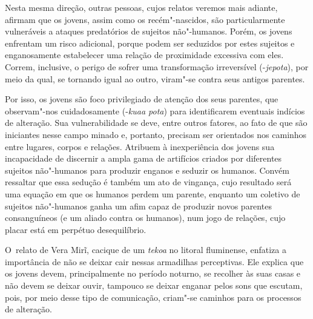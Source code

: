 Nesta mesma direção, outras pessoas, cujos relatos veremos mais adiante,
afirmam que os jovens, assim como os recém"-nascidos, são
particularmente vulneráveis a ataques predatórios de sujeitos
não"-humanos. Porém, os jovens enfrentam um risco adicional, porque
podem ser seduzidos por estes sujeitos e enganosamente estabelecer uma
relação de proximidade excessiva com eles. Correm, inclusive, o perigo
de sofrer uma transformação irreversível (-\emph{jepota}), por meio da qual,
se tornando igual ao outro, viram"-se contra seus antigos parentes.

Por isso, os jovens são foco privilegiado de atenção dos seus parentes,
que observam"-nos cuidadosamente (-\emph{kuaa pota}) para identificarem
eventuais indícios de alteração. Sua vulnerabilidade se deve, entre
outros fatores, ao fato de que são iniciantes nesse campo minado e,
portanto, precisam ser orientados nos caminhos entre lugares, corpos e
relações. Atribuem à inexperiência dos jovens sua incapacidade de
discernir a ampla gama de artifícios criados por diferentes sujeitos
não"-humanos para produzir enganos e seduzir os humanos. Convém
ressaltar que essa sedução é também um ato de vingança, cujo resultado
será uma equação em que os humanos perdem um parente, enquanto um
coletivo de sujeitos não"-humanos ganha um afim capaz de produzir novos
parentes consanguíneos (e um aliado contra os humanos), num jogo de
relações, cujo placar está em perpétuo desequilíbrio.

O~relato de Vera Mirĩ, cacique de um \emph{tekoa} no litoral fluminense,
enfatiza a importância de não se deixar cair nessas armadilhas
perceptivas. Ele explica que os jovens devem, principalmente no período
noturno, se recolher às suas casas e não devem se deixar ouvir,
tampouco se deixar enganar pelos sons que escutam, pois, por meio desse
tipo de comunicação, criam"-se caminhos para os processos de alteração.

\bigskip

